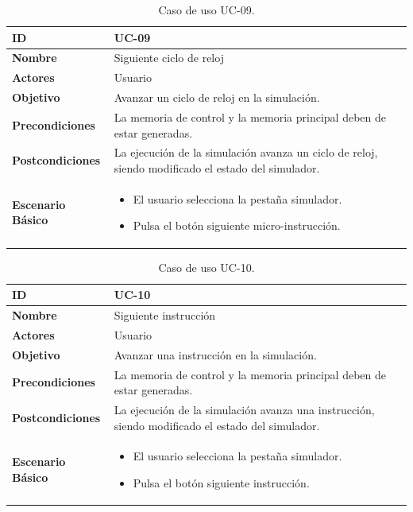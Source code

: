\begin{center}
\begin{table}[htbp]
\centering
\caption{Caso de uso UC-09.}
\begin{tabular}{@{}p{2.5cm} p{9cm}@{}} 
\toprule
\textbf{ID}	& UC-09  \\
\midrule
\textbf{Nombre} 		& Siguiente ciclo de reloj   \\
\midrule
\textbf{Actores} 		&	Usuario  \\
\midrule
\textbf{Objetivo} 	&	Avanzar un ciclo de reloj en la simulación.	 \\
\midrule
\textbf{Precondiciones}	&	La memoria de control y la memoria principal deben de estar generadas.  \\
\midrule
\textbf{Postcondiciones} 	& La ejecución de la simulación avanza un ciclo de reloj, siendo modificado el estado del simulador.   \\
\midrule
\textbf{Escenario Básico} 	&  \begin{itemize}
\item El usuario selecciona la pestaña simulador.
\item Pulsa el botón siguiente micro-instrucción.
\end{itemize} \\
\bottomrule
\end{tabular}
\label{tab:uc09}
\end{table}
\end{center}

\begin{center}
\begin{table}[htbp]
\centering
\caption{Caso de uso UC-10.}
\begin{tabular}{@{}p{2.5cm} p{9cm}@{}} 
\toprule
\textbf{ID}	& UC-10  \\
\midrule
\textbf{Nombre} 		& Siguiente instrucción   \\
\midrule
\textbf{Actores} 		&	Usuario  \\
\midrule
\textbf{Objetivo} 	&	Avanzar una instrucción en la simulación.	 \\
\midrule
\textbf{Precondiciones}	&	La memoria de control y la memoria principal deben de estar generadas.  \\
\midrule
\textbf{Postcondiciones} 	& La ejecución de la simulación avanza una instrucción, siendo modificado el estado del simulador.   \\
\midrule
\textbf{Escenario Básico} 	&  \begin{itemize}
\item El usuario selecciona la pestaña simulador.
\item Pulsa el botón siguiente instrucción.
\end{itemize} \\
\bottomrule
\end{tabular}
\label{tab:uc10}
\end{table}
\end{center}

